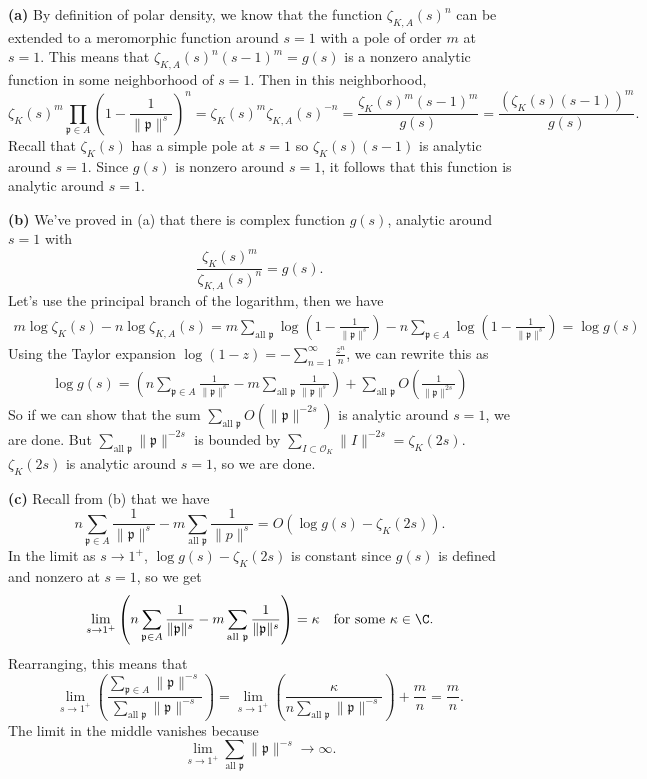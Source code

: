 \documentclass[11pt,letterpaper]{article}
\begin{document}
\begin{solution}
    \textbf{(a)} By definition of polar density, we know that the function $\zeta_{K,A}(s)^n$ can be extended to a meromorphic function around $s=1$ with a pole of order $m$ at $s=1$. This means that $\zeta_{K,A}(s)^n(s-1)^m=g(s)$ is a nonzero analytic function in some neighborhood of $s=1$. Then in this neighborhood,
    \[
        \zeta_{K}(s)^m\prod_{\mathfrak{p}\in A}\left(1-\frac{1}{\|\mathfrak{p}\|^s}\right)^n = \zeta_K(s)^m\zeta_{K,A}(s)^{-n} = \frac{\zeta_K(s)^m(s-1)^m}{g(s)}=\frac{(\zeta_K(s)(s-1))^m}{g(s)}.
    \] 
    Recall that $\zeta_K(s)$ has a simple pole at $s=1$ so $\zeta_K(s)(s-1)$ is analytic around $s=1$. Since $g(s)$ is nonzero around $s=1$, it follows that this function is analytic around $s=1$.

    \textbf{(b)} We've proved in (a) that there is complex function $g(s)$, analytic around $s=1$ with 
    \[
        \frac{\zeta_K(s)^m}{\zeta_{K,A}(s)^n} = g(s).
    \] 
    Let's use the principal branch of the logarithm, then we have
    \[\begin{aligned}
        m\log \zeta_K(s)-n\log \zeta_{K,A}(s) = m\sum_{\textrm{all }\mathfrak{p}}\log\left(1-\frac{1}{\|\mathfrak{p}\|^s}\right)-n\sum_{\mathfrak{p}\in A}\log\left(1-\frac{1}{\|\mathfrak{p}\|^s}\right) = \log g(s)
    \end{aligned}\]
    Using the Taylor expansion $\log(1-z)=-\sum^\infty_{n=1}\frac{z^n}{n}$, we can rewrite this as
    \[\begin{aligned}
        \log g(s)=\left(n\sum_{\mathfrak{p}\in A}\frac{1}{\|\mathfrak{p}\|^s}-m\sum_{\textrm{all }\mathfrak{p}}\frac{1}{\|\mathfrak{p}\|^s}\right)+\sum_{\textrm{all }\mathfrak{p}}O\left(\frac{1}{\|\mathfrak{p}\|^{2s}}\right)
    \end{aligned}\]
    So if we can show that the sum $\sum_{\textrm{all }\mathfrak{p}} O\left(\|\mathfrak{p}\|^{-2s}\right)$ is analytic around $s=1$, we are done. But $\sum_{\textrm{all }\mathfrak{p}} \|\mathfrak{p}\|^{-2s}$ is bounded by $\sum_{I\subset \mathcal{O}_K} \|I\|^{-2s}=\zeta_K(2s)$. $\zeta_K(2s)$ is analytic around $s=1$, so we are done. 

    \textbf{(c)} Recall from (b) that we have
    \[
        n\sum_{\mathfrak{p}\in A}\frac{1}{\|\mathfrak{p}\|^s}-m\sum_{\textrm{all }\mathfrak{p}}\frac{1}{\|p\|^s}=O(\log g(s) - \zeta_K(2s)).
    \] 
    In the limit as $s\to 1^+$, $\log g(s)-\zeta_K(2s)$ is constant since $g(s)$ is defined and nonzero at $s=1$, so we get
    \[
        \lim_{s\to 1^+}\left(n\sum_{\mathfrak{p}\in A}\frac{1}{\|\mathfrak{p}\|^s}-m\sum_{\textrm{all }\mathfrak{p}}\frac{1}{\|\mathfrak{p}\|^s}\right)=\kappa\quad\textrm{for some }\kappa\in \C.
    \] 
    Rearranging, this means that
    \[
        \lim_{s\to 1^+}\left(\frac{\sum_{\mathfrak{p}\in A}\|\mathfrak{p}\|^{-s}}{\sum_{\textrm{all }\mathfrak{p}}\|\mathfrak{p}\|^{-s}}\right)=\lim_{s\to 1^+}\left(\frac{\kappa}{n\sum_{\textrm{all }\mathfrak{p}}\|\mathfrak{p}\|^{-s}}\right) + \frac{m}{n} = \frac{m}{n}.
    \] 
    The limit in the middle vanishes because
    \[
        \lim_{s\to 1^+}\sum_{\textrm{all }\mathfrak{p}}\|\mathfrak{p}\|^{-s} \to \infty.
    \] 
\end{solution}
\end{document}
